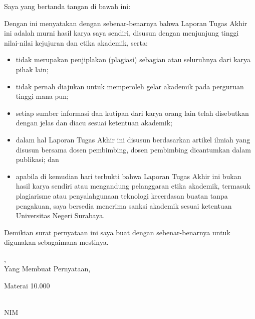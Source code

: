 
\noindent Saya yang bertanda tangan di bawah ini:


\noindent Dengan ini menyatakan dengan sebenar-benarnya bahwa Laporan Tugas
Akhir ini adalah murni hasil karya saya sendiri, disusun dengan menjunjung
tinggi nilai-nilai kejujuran dan etika akademik, serta:

\begin{itemize}[leftmargin=0.63cm,label=--,nosep]
  \item tidak merupakan penjiplakan (plagiasi) sebagian atau seluruhnya dari
    karya pihak lain;
  \item tidak pernah diajukan untuk memperoleh gelar akademik pada perguruan
    tinggi mana pun;
  \item setiap sumber informasi dan kutipan dari karya orang lain telah
    disebutkan dengan jelas dan diacu sesuai ketentuan akademik;
  \item dalam hal Laporan Tugas Akhir ini disusun berdasarkan artikel ilmiah
    yang disusun bersama dosen pembimbing, dosen pembimbing dicantumkan dalam
    publikasi; dan
  \item apabila di kemudian hari terbukti bahwa Laporan Tugas Akhir ini bukan
    hasil karya sendiri atau mengandung pelanggaran etika akademik, termasuk
    plagiarisme atau penyalahgunaan teknologi kecerdasan buatan tanpa
    pengakuan, saya bersedia menerima sanksi akademik sesuai ketentuan
    Universitas Negeri Surabaya.
\end{itemize}

\noindent Demikian surat pernyataan ini saya buat dengan sebenar-benarnya untuk
digunakan sebagaimana mestinya.

\vspace{6.9pt}
\noindent\hfill
\begin{minipage}{0.52\textwidth}
  \raggedright
  \NamaKota, \TanggalPernyataan\\
  Yang Membuat Pernyataan,

  \vspace{0.7cm}
  Materai 10.000
  \vspace{0.7cm}

  \underline{\NamaMahasiswa}\\
  NIM \NIM
\end{minipage}
